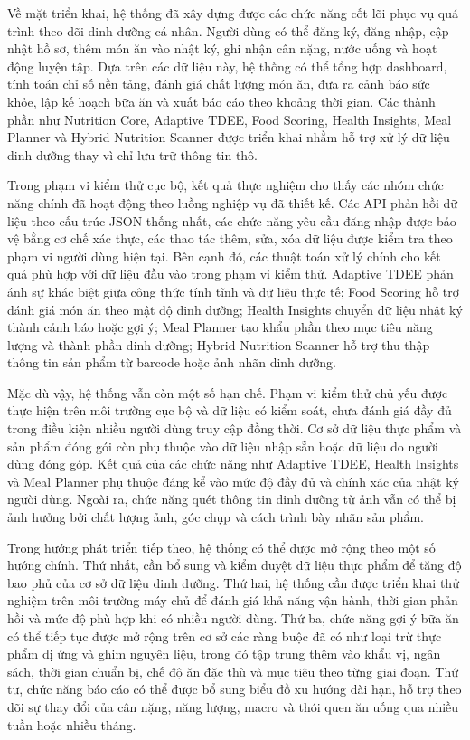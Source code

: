 \documentclass[12pt, a4paper]{report}
\begin{document}
Về mặt triển khai, hệ thống đã xây dựng được các chức năng cốt lõi phục vụ quá trình theo dõi dinh dưỡng cá nhân. Người dùng có thể đăng ký, đăng nhập, cập nhật hồ sơ, thêm món ăn vào nhật ký, ghi nhận cân nặng, nước uống và hoạt động luyện tập. Dựa trên các dữ liệu này, hệ thống có thể tổng hợp dashboard, tính toán chỉ số nền tảng, đánh giá chất lượng món ăn, đưa ra cảnh báo sức khỏe, lập kế hoạch bữa ăn và xuất báo cáo theo khoảng thời gian. Các thành phần như Nutrition Core, Adaptive TDEE, Food Scoring, Health Insights, Meal Planner và Hybrid Nutrition Scanner được triển khai nhằm hỗ trợ xử lý dữ liệu dinh dưỡng thay vì chỉ lưu trữ thông tin thô.

Trong phạm vi kiểm thử cục bộ, kết quả thực nghiệm cho thấy các nhóm chức năng chính đã hoạt động theo luồng nghiệp vụ đã thiết kế. Các API phản hồi dữ liệu theo cấu trúc JSON thống nhất, các chức năng yêu cầu đăng nhập được bảo vệ bằng cơ chế xác thực, các thao tác thêm, sửa, xóa dữ liệu được kiểm tra theo phạm vi người dùng hiện tại. Bên cạnh đó, các thuật toán xử lý chính cho kết quả phù hợp với dữ liệu đầu vào trong phạm vi kiểm thử. Adaptive TDEE phản ánh sự khác biệt giữa công thức tính tĩnh và dữ liệu thực tế; Food Scoring hỗ trợ đánh giá món ăn theo mật độ dinh dưỡng; Health Insights chuyển dữ liệu nhật ký thành cảnh báo hoặc gợi ý; Meal Planner tạo khẩu phần theo mục tiêu năng lượng và thành phần dinh dưỡng; Hybrid Nutrition Scanner hỗ trợ thu thập thông tin sản phẩm từ barcode hoặc ảnh nhãn dinh dưỡng.

Mặc dù vậy, hệ thống vẫn còn một số hạn chế. Phạm vi kiểm thử chủ yếu được thực hiện trên môi trường cục bộ và dữ liệu có kiểm soát, chưa đánh giá đầy đủ trong điều kiện nhiều người dùng truy cập đồng thời. Cơ sở dữ liệu thực phẩm và sản phẩm đóng gói còn phụ thuộc vào dữ liệu nhập sẵn hoặc dữ liệu do người dùng đóng góp. Kết quả của các chức năng như Adaptive TDEE, Health Insights và Meal Planner phụ thuộc đáng kể vào mức độ đầy đủ và chính xác của nhật ký người dùng. Ngoài ra, chức năng quét thông tin dinh dưỡng từ ảnh vẫn có thể bị ảnh hưởng bởi chất lượng ảnh, góc chụp và cách trình bày nhãn sản phẩm.

Trong hướng phát triển tiếp theo, hệ thống có thể được mở rộng theo một số hướng chính. Thứ nhất, cần bổ sung và kiểm duyệt dữ liệu thực phẩm để tăng độ bao phủ của cơ sở dữ liệu dinh dưỡng. Thứ hai, hệ thống cần được triển khai thử nghiệm trên môi trường máy chủ để đánh giá khả năng vận hành, thời gian phản hồi và mức độ phù hợp khi có nhiều người dùng. Thứ ba, chức năng gợi ý bữa ăn có thể tiếp tục được mở rộng trên cơ sở các ràng buộc đã có như loại trừ thực phẩm dị ứng và ghim nguyên liệu, trong đó tập trung thêm vào khẩu vị, ngân sách, thời gian chuẩn bị, chế độ ăn đặc thù và mục tiêu theo từng giai đoạn. Thứ tư, chức năng báo cáo có thể được bổ sung biểu đồ xu hướng dài hạn, hỗ trợ theo dõi sự thay đổi của cân nặng, năng lượng, macro và thói quen ăn uống qua nhiều tuần hoặc nhiều tháng.
\end{document}
